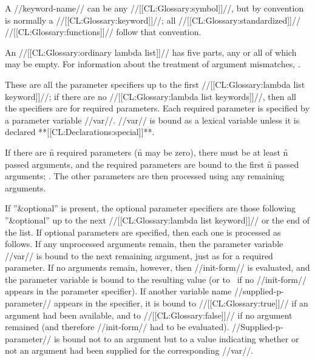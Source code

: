 A //keyword-name// can be any //[[CL:Glossary:symbol]]//,  but by convention is normally a //[[CL:Glossary:keyword]]//; all //[[CL:Glossary:standardized]]// //[[CL:Glossary:functions]]// follow that convention.

An //[[CL:Glossary:ordinary lambda list]]// has five parts, any or all of which may be empty. For information about the treatment of argument mismatches, \seesection\FuncallErrorChecking.

      These are all the parameter specifiers up to  the first //[[CL:Glossary:lambda list keyword]]//; if there are no //[[CL:Glossary:lambda list keywords]]//,  then all the specifiers are for required parameters. Each required parameter is specified by a parameter variable //var//. //var// is bound as a lexical variable unless it is declared **[[CL:Declarations:special]]**.

If there are \f{n} required parameters (\f{n} may be zero),  there must be at least \f{n} passed arguments, and the  required parameters are bound to the first \f{n} passed arguments; \seesection\FuncallErrorChecking. The other parameters are then processed using any remaining arguments.

\endsubsubsection%

 

If ''&optional'' is present, the optional parameter specifiers are those following  ''&optional''  up to the next //[[CL:Glossary:lambda list keyword]]// or the end of the list. If optional parameters are specified, then each one is processed as follows.  If any unprocessed arguments remain, then the parameter variable //var// is bound to the next remaining argument, just as for a required parameter.  If no arguments remain, however, then //init-form//  is evaluated, and the parameter variable is bound to the resulting value  (or to \nil\ if no //init-form// appears in the parameter specifier). If another variable name //supplied-p-parameter//  appears in the specifier, it is bound to //[[CL:Glossary:true]]// if an argument had been available, and to //[[CL:Glossary:false]]// if no argument remained (and therefore //init-form// had to be evaluated). //Supplied-p-parameter// is bound not to an argument but to a value indicating whether or not an argument had been supplied for the corresponding //var//.

\endsubsubsection%

